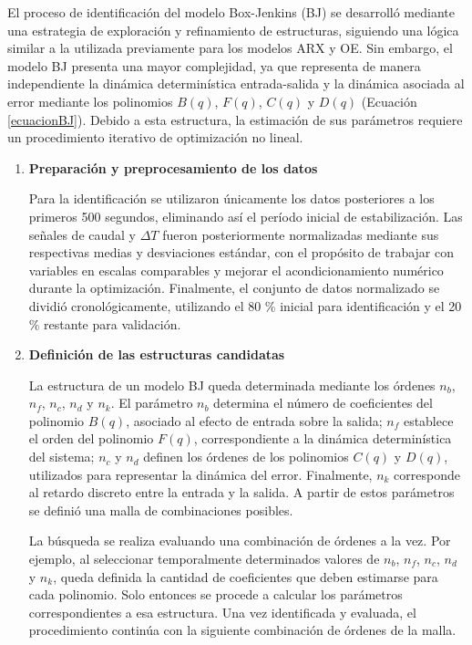 \documentclass[11pt]{report}
\begin{document}
El proceso de identificación del modelo Box-Jenkins (BJ) se desarrolló mediante una estrategia de exploración y refinamiento de estructuras, siguiendo una lógica similar a la utilizada previamente para los modelos ARX y OE. Sin embargo, el modelo BJ presenta una mayor complejidad, ya que representa de manera independiente la dinámica determinística entrada-salida y la dinámica asociada al error mediante los polinomios $B(q)$, $F(q)$, $C(q)$ y $D(q)$ (Ecuación \ref{ecuacionBJ}). Debido a esta estructura, la estimación de sus parámetros requiere un procedimiento iterativo de optimización no lineal.
\begin{enumerate}


\item \textbf{Preparación y preprocesamiento de los datos}
    
    Para la identificación se utilizaron únicamente los datos posteriores a los primeros 500 segundos, eliminando así el período inicial de estabilización. Las señales de caudal y $\Delta T$ fueron posteriormente normalizadas mediante sus respectivas medias y desviaciones estándar, con el propósito de trabajar con variables en escalas comparables y mejorar el acondicionamiento numérico durante la optimización. Finalmente, el conjunto de datos normalizado se dividió cronológicamente, utilizando el 80 \% inicial para identificación y el 20 \% restante para validación.
    
    \item \textbf{Definición de las estructuras candidatas}

    La estructura de un modelo BJ queda determinada mediante los órdenes $n_b$, $n_f$, $n_c$, $n_d$ y $n_k$. El parámetro $n_b$ determina el número de coeficientes del polinomio $B(q)$, asociado al efecto de entrada sobre la salida; $n_f$ establece el orden del polinomio $F(q)$, correspondiente a la dinámica determinística del sistema; $n_c$ y $n_d$ definen los órdenes de los polinomios $C(q)$ y $D(q)$, utilizados para representar la dinámica del error. Finalmente, $n_k$ corresponde al retardo discreto entre la entrada y la salida. A partir de estos parámetros se definió una malla de combinaciones posibles.

La búsqueda se realiza evaluando una combinación de órdenes a la vez. Por ejemplo, al seleccionar temporalmente determinados valores de $n_b$, $n_f$, $n_c$, $n_d$ y $n_k$, queda definida la cantidad de coeficientes que deben estimarse para cada polinomio. Solo entonces se procede a calcular los parámetros correspondientes a esa estructura. Una vez identificada y evaluada, el procedimiento continúa con la siguiente combinación de órdenes de la malla.


\end{enumerate}
\end{document}
